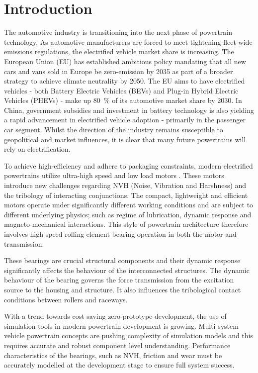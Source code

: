 \chapter{Introduction} \label{Introduction}

The automotive industry is transitioning into the next phase of powertrain technology. As automotive manufacturers are forced to meet tightening fleet-wide emissions regulations, the electrified vehicle market share is increasing. The European Union (EU) has established ambitious policy \cite{EUL110/5} mandating that all new cars and vans sold in Europe be zero-emission by 2035 as part of a broader strategy to achieve climate neutrality by 2050. The EU aims to have electrified vehicles - both Battery Electric Vehicles (BEVs) and Plug-in Hybrid Electric Vehicles (PHEVs) - make up 80~\% of its automotive market share by 2030. In China, government subsidies and investment in battery technology is also yielding a rapid advancement in electrified vehicle adoption - primarily in the passenger car segment. Whilst the direction of the industry remains susceptible to geopolitical and market influences, it is clear that many future powertrains will rely on electrification.

To achieve high-efficiency and adhere to packaging constraints, modern electrified powertrains utilize ultra-high speed and low load motors \cite{Cai2021}. These motors introduce new challenges regarding NVH (Noise, Vibration and Harshness) and the tribology of interacting conjunctions. The compact, lightweight and efficient motors operate under significantly different working conditions and are subject to different underlying physics; such as regime of lubrication, dynamic response and magneto-mechanical interactions. This style of powertrain architecture therefore involves high-speed rolling element bearing operation in both the motor and transmission.

These bearings are crucial structural components and their dynamic response significantly affects the behaviour of the interconnected structures. The dynamic behaviour of the bearing governs the force transmission from the excitation source to the housing and structure. It also influences the tribological contact conditions between rollers and raceways.

With a trend towards cost saving zero-prototype development, the use of simulation tools in modern powertrain development is growing. Multi-system vehicle powertrain concepts are pushing complexity of simulation models and this requires accurate and robust component level understanding. Performance characteristics of the bearings, such as NVH, friction and wear must be accurately modelled at the development stage to ensure full system success.


